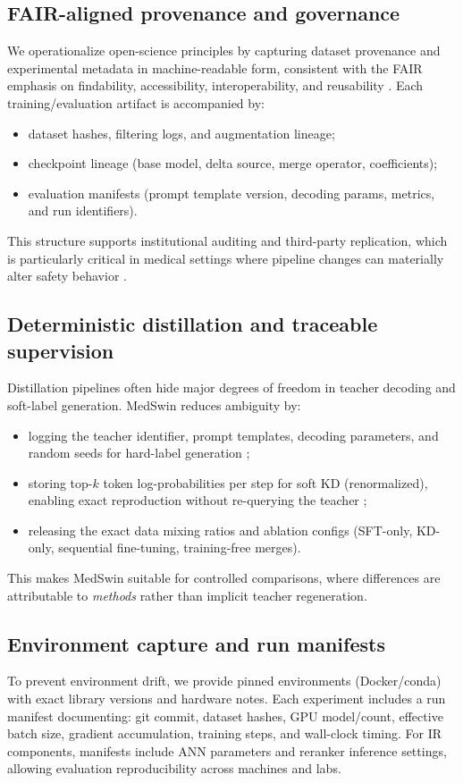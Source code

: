 \documentclass[conference]{IEEEtran}
\begin{document}
\subsection{FAIR-aligned provenance and governance}
We operationalize open-science principles by capturing dataset provenance and experimental metadata in machine-readable form, consistent with the FAIR emphasis on findability, accessibility, interoperability, and reusability \cite{wilkinson2016fair}. Each training/evaluation artifact is accompanied by:
\begin{itemize}
    \item dataset hashes, filtering logs, and augmentation lineage;
    \item checkpoint lineage (base model, delta source, merge operator, coefficients);
    \item evaluation manifests (prompt template version, decoding params, metrics, and run identifiers).
\end{itemize}
This structure supports institutional auditing and third-party replication, which is particularly critical in medical settings where pipeline changes can materially alter safety behavior \cite{vollmer2020mlhealth}.

\subsection{Deterministic distillation and traceable supervision}
Distillation pipelines often hide major degrees of freedom in teacher decoding and soft-label generation. MedSwin reduces ambiguity by:
\begin{itemize}
    \item logging the teacher identifier, prompt templates, decoding parameters, and random seeds for hard-label generation \cite{google2025medgemma};
    \item storing top-$k$ token log-probabilities per step for soft KD (renormalized), enabling exact reproduction without re-querying the teacher \cite{hinton2015distilling};
    \item releasing the exact data mixing ratios and ablation configs (SFT-only, KD-only, sequential fine-tuning, training-free merges).
\end{itemize}
This makes MedSwin suitable for controlled comparisons, where differences are attributable to \emph{methods} rather than implicit teacher regeneration.

\subsection{Environment capture and run manifests}
To prevent environment drift, we provide pinned environments (Docker/conda) with exact library versions and hardware notes. Each experiment includes a run manifest documenting: git commit, dataset hashes, GPU model/count, effective batch size, gradient accumulation, training steps, and wall-clock timing. For IR components, manifests include ANN parameters and reranker inference settings, allowing evaluation reproducibility across machines and labs.
\end{document}
